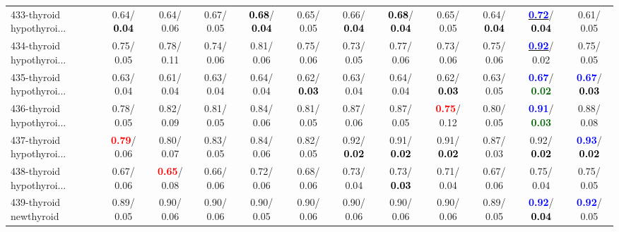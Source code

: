 \begin{table}[h]
\begin{center}
{\begin{tabular}{lc|c|c|c|c|c|c|c|c|c|c}
433-thyroid hypothyroi... &   0.64/\textcolor{black}{\textbf{  0.04}} &   0.64/  0.06 &   0.67/  0.05 & \textcolor{black}{\textbf{  0.68}}/\textcolor{black}{\textbf{  0.04}} &   0.65/  0.05 &   0.66/\textcolor{black}{\textbf{  0.04}} & \textcolor{black}{\textbf{  0.68}}/\textcolor{black}{\textbf{  0.04}} &   0.65/  0.05 &   0.64/\textcolor{black}{\textbf{  0.04}} & \underline{\textcolor{blue}{\textbf{  0.72}}}/\textcolor{black}{\textbf{  0.04}} &   0.61/  0.05 \\
434-thyroid hypothyroi... &   0.75/  0.05 &   0.78/  0.11 &   0.74/  0.06 &   0.81/  0.06 &   0.75/  0.06 &   0.73/  0.05 &   0.77/  0.06 &   0.73/  0.06 &   0.75/  0.06 & \underline{\textcolor{blue}{\textbf{  0.92}}}/  0.02 &   0.75/  0.05 \\
435-thyroid hypothyroi... &   0.63/  0.04 &   0.61/  0.04 &   0.63/  0.04 &   0.64/  0.04 &   0.62/\textcolor{black}{\textbf{  0.03}} &   0.63/  0.04 &   0.64/  0.04 &   0.62/\textcolor{black}{\textbf{  0.03}} &   0.63/  0.05 & \textcolor{blue}{\textbf{  0.67}}/\textcolor{darkgreen}{\textbf{  0.02}} & \textcolor{blue}{\textbf{  0.67}}/\textcolor{black}{\textbf{  0.03}} \\
436-thyroid hypothyroi... &   0.78/  0.05 &   0.82/  0.09 &   0.81/  0.05 &   0.84/  0.06 &   0.81/  0.05 &   0.87/  0.06 &   0.87/  0.05 & \textcolor{red}{\textbf{  0.75}}/  0.12 &   0.80/  0.05 & \textcolor{blue}{\textbf{  0.91}}/\textcolor{darkgreen}{\textbf{  0.03}} &   0.88/  0.08 \\
437-thyroid hypothyroi... & \textcolor{red}{\textbf{  0.79}}/  0.06 &   0.80/  0.07 &   0.83/  0.05 &   0.84/  0.06 &   0.82/  0.05 &   0.92/\textcolor{black}{\textbf{  0.02}} &   0.91/\textcolor{black}{\textbf{  0.02}} &   0.91/\textcolor{black}{\textbf{  0.02}} &   0.87/  0.03 &   0.92/\textcolor{black}{\textbf{  0.02}} & \textcolor{blue}{\textbf{  0.93}}/\textcolor{black}{\textbf{  0.02}} \\ \hline
438-thyroid hypothyroi... &   0.67/  0.06 & \textcolor{red}{\textbf{  0.65}}/  0.08 &   0.66/  0.06 &   0.72/  0.06 &   0.68/  0.06 &   0.73/  0.04 &   0.73/\textcolor{black}{\textbf{  0.03}} &   0.71/  0.04 &   0.67/  0.06 &   0.75/  0.04 &   0.75/  0.05 \\
439-thyroid newthyroid &   0.89/  0.05 &   0.90/  0.06 &   0.90/  0.06 &   0.90/  0.05 &   0.90/  0.06 &   0.90/  0.06 &   0.90/  0.06 &   0.90/  0.06 &   0.89/  0.05 & \textcolor{blue}{\textbf{  0.92}}/\textcolor{black}{\textbf{  0.04}} & \textcolor{blue}{\textbf{  0.92}}/  0.05 \\

\end{tabular}}
\end{center}
\end{table}
